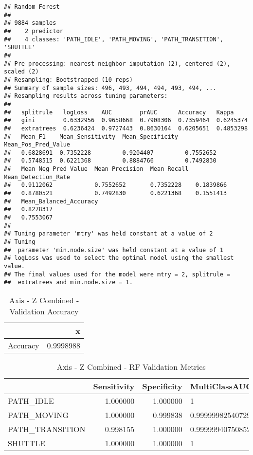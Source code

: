 \documentclass[]{article}
\begin{document}
\begin{verbatim}
## Random Forest 
## 
## 9884 samples
##    2 predictor
##    4 classes: 'PATH_IDLE', 'PATH_MOVING', 'PATH_TRANSITION', 'SHUTTLE' 
## 
## Pre-processing: nearest neighbor imputation (2), centered (2), scaled (2) 
## Resampling: Bootstrapped (10 reps) 
## Summary of sample sizes: 496, 493, 494, 494, 493, 494, ... 
## Resampling results across tuning parameters:
## 
##   splitrule   logLoss    AUC        prAUC      Accuracy   Kappa    
##   gini        0.6332956  0.9658668  0.7908306  0.7359464  0.6245374
##   extratrees  0.6236424  0.9727443  0.8630164  0.6205651  0.4853298
##   Mean_F1    Mean_Sensitivity  Mean_Specificity  Mean_Pos_Pred_Value
##   0.6828691  0.7352228         0.9204407         0.7552652          
##   0.5748515  0.6221368         0.8884766         0.7492830          
##   Mean_Neg_Pred_Value  Mean_Precision  Mean_Recall  Mean_Detection_Rate
##   0.9112062            0.7552652       0.7352228    0.1839866          
##   0.8780521            0.7492830       0.6221368    0.1551413          
##   Mean_Balanced_Accuracy
##   0.8278317             
##   0.7553067             
## 
## Tuning parameter 'mtry' was held constant at a value of 2
## Tuning
##  parameter 'min.node.size' was held constant at a value of 1
## logLoss was used to select the optimal model using the smallest value.
## The final values used for the model were mtry = 2, splitrule =
##  extratrees and min.node.size = 1.
\end{verbatim}

\begin{table}[!h]

\caption{\label{tab:sensor-z-combined-rf-results}Axis - Z Combined - Validation Accuracy}
\centering
\begin{tabular}[t]{lr}
\toprule
  & x\\
\midrule
Accuracy & 0.9998988\\
\bottomrule
\end{tabular}
\end{table}

\begin{table}[!h]

\caption{\label{tab:sensor-z-combined-rf-results}Axis - Z Combined - RF Validation Metrics}
\centering
\begin{tabular}[t]{lrrl}
\toprule
  & Sensitivity & Specificity & MultiClassAUC\\
\midrule
PATH\_IDLE & 1.000000 & 1.000000 & 1\\
PATH\_MOVING & 1.000000 & 0.999838 & 0.99999982540729\\
PATH\_TRANSITION & 0.998155 & 1.000000 & 0.999999407508526\\
SHUTTLE & 1.000000 & 1.000000 & 1\\
\bottomrule
\end{tabular}
\end{table}
\end{document}
